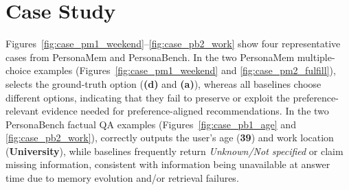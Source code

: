 




\section{Case Study}
Figures~\ref{fig:case_pm1_weekend}--\ref{fig:case_pb2_work} show four representative cases from PersonaMem and PersonaBench. In the two PersonaMem multiple-choice examples (Figures~\ref{fig:case_pm1_weekend} and \ref{fig:case_pm2_fulfill}), \ourmodel selects the ground-truth option (\textbf{(d)} and \textbf{(a)}), whereas all baselines choose different options, indicating that they fail to preserve or exploit the preference-relevant evidence needed for preference-aligned recommendations. In the two PersonaBench factual QA examples (Figures~\ref{fig:case_pb1_age} and \ref{fig:case_pb2_work}), \ourmodel correctly outputs the user’s age (\textbf{39}) and work location (\textbf{University}), while baselines frequently return \emph{Unknown/Not specified} or claim missing information, consistent with information being unavailable at answer time due to memory evolution and/or retrieval failures.

